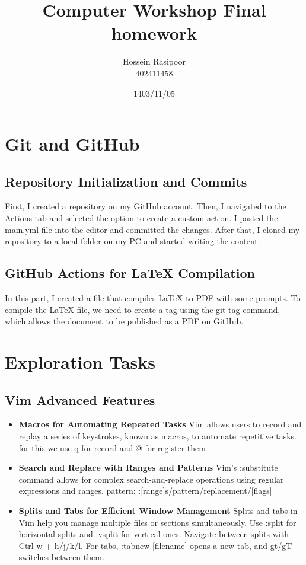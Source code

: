 \documentclass[titlepage]{article}
\title{ Computer Workshop Final homework}
\author{Hossein Rasipoor \\ 402411458}
\date{1403/11/05}
\begin{document}
\maketitle
\tableofcontents
\newpage

\section{Git and GitHub}
\subsection{Repository Initialization and Commits}
First, I created a repository on my GitHub account. Then, I navigated to the Actions tab and selected the option to create a custom action. I pasted the main.yml file into the editor and committed the changes. After that, I cloned my repository to a local folder on my PC and started writing the content.

\subsection{GitHub Actions for LaTeX Compilation}
In this part, I created a file that compiles LaTeX to PDF with some prompts. To compile the LaTeX file, we need to create a tag using the git tag command, which allows the document to be published as a PDF on GitHub.
\section{Exploration Tasks}
\subsection{Vim Advanced Features}
\begin{itemize}
    \item \textbf{Macros for Automating Repeated Tasks}
\newline
Vim allows users to record and replay a series of keystrokes, known as macros, to automate repetitive tasks. for this we use q for record and @ for register them
    \item \textbf{Search and Replace with Ranges and Patterns}
\newline
Vim's :substitute command allows for complex search-and-replace operations using regular expressions and ranges. pattern:
\newline
:[range]s/pattern/replacement/[flags]

    \item \textbf{Splits and Tabs for Efficient Window Management}
    \newline Splits and tabs in Vim help you manage multiple files or sections simultaneously. Use :split for horizontal splits and :vsplit for vertical ones. Navigate between splits with Ctrl-w + h/j/k/l. For tabs, :tabnew [filename] opens a new tab, and gt/gT switches between them.
\end{itemize}
\end{document}
